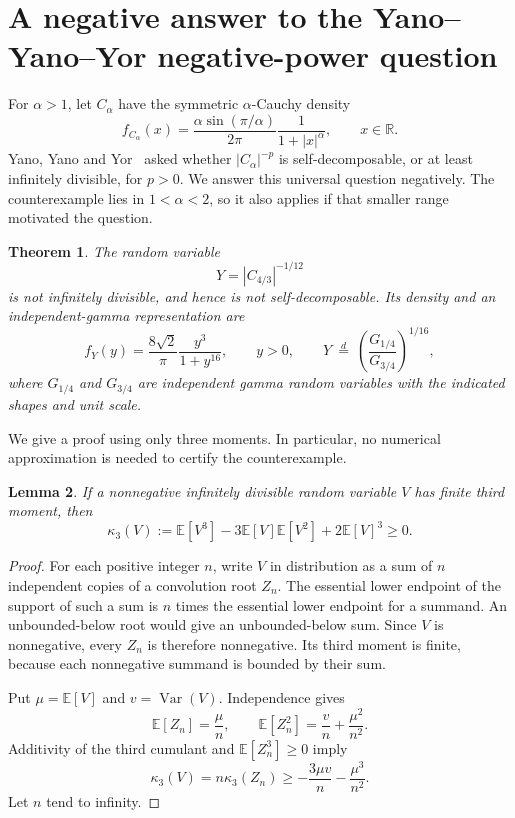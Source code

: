 \documentclass[11pt,a4paper]{article}
\newtheorem{theorem}{Theorem}[section]
\newtheorem{lemma}[theorem]{Lemma}
\theoremstyle{definition}
\theoremstyle{remark}
\newcommand{\E}{\mathbb E}
\DeclareMathOperator{\Var}{Var}
\numberwithin{equation}{section}
\begin{document}
\section{A negative answer to the Yano--Yano--Yor negative-power question}
\label{sec:yyy}

For $\alpha>1$, let $C_\alpha$ have the symmetric $\alpha$-Cauchy density
\begin{equation}
 f_{C_\alpha}(x)=\frac{\alpha\sin(\pi/\alpha)}{2\pi}
                  \frac{1}{1+|x|^\alpha},\qquad x\in\mathbb R.
 \label{eq:yyy-density}
\end{equation}
Yano, Yano and Yor~\cite[Remark~2.9(iii)]{YanoYanoYor2009}
asked whether $|C_\alpha|^{-p}$ is self-decomposable, or at least
infinitely divisible, for $p>0$. We answer this universal question
negatively. The counterexample lies in $1<\alpha<2$, so it also applies
if that smaller range motivated the question.

\begin{theorem}
\label{thm:yyy-explicit}
The random variable
\[
 Y=|C_{4/3}|^{-1/12}
\]
is not infinitely divisible, and hence is not self-decomposable.
Its density and an independent-gamma representation are
\begin{equation}
 f_Y(y)=\frac{8\sqrt2}{\pi}\frac{y^3}{1+y^{16}},\qquad y>0,
 \qquad
 Y\ \stackrel{d}{=}\
 \left(\frac{G_{1/4}}{G_{3/4}}\right)^{1/16},
 \label{eq:yyy-gb2}
\end{equation}
where $G_{1/4}$ and $G_{3/4}$ are independent gamma random variables
with the indicated shapes and unit scale.
\end{theorem}

We give a proof using only three moments. In particular, no numerical
approximation is needed to certify the counterexample.

\begin{lemma}
\label{lem:yyy-third-cumulant}
If a nonnegative infinitely divisible random variable $V$ has finite
third moment, then
\[
 \kappa_3(V):=\E[V^3]-3\E[V]\E[V^2]+2\E[V]^3\ge0.
\]
\end{lemma}

\begin{proof}
For each positive integer $n$, write $V$ in distribution as a sum of
$n$ independent copies of a convolution root $Z_n$. The essential lower
endpoint of the support of such a sum is $n$ times the essential lower
endpoint for a summand. An unbounded-below root would give an
unbounded-below sum. Since $V$ is nonnegative, every $Z_n$ is therefore
nonnegative. Its third moment is finite, because each nonnegative
summand is bounded by their sum.

Put $\mu=\E[V]$ and $v=\Var(V)$. Independence gives
\[
 \E[Z_n]=\frac{\mu}{n},\qquad
 \E[Z_n^2]=\frac{v}{n}+\frac{\mu^2}{n^2}.
\]
Additivity of the third cumulant and $\E[Z_n^3]\ge0$ imply
\[
 \kappa_3(V)=n\kappa_3(Z_n)
 \ge -\frac{3\mu v}{n}-\frac{\mu^3}{n^2}.
\]
Let $n$ tend to infinity.
\end{proof}
\end{document}
